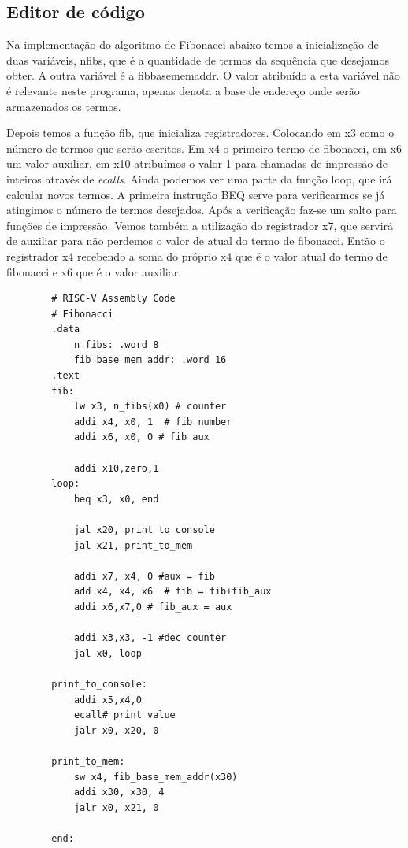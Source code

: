 \subsection{Editor de código}


	Na implementação do algoritmo de Fibonacci abaixo temos a inicialização de duas variáveis, n\textunderscore fibs, que é a quantidade de termos da sequência que desejamos obter. A outra variável é a fib\textunderscore base\textunderscore mem\textunderscore addr. O valor atribuído a esta variável não é relevante neste programa, apenas denota a base de endereço onde serão armazenados os termos.

	Depois temos a função fib, que inicializa registradores. Colocando em x3 como o número de termos que serão escritos. Em x4 o primeiro termo de fibonacci, em x6 um valor auxiliar, em x10 atribuímos o valor 1 para chamadas de impressão de inteiros através de \textit{ecalls}. Ainda podemos ver uma parte da função loop, que irá calcular novos termos. A primeira instrução BEQ serve para verificarmos se já atingimos o número de termos desejados. Após a verificação faz-se um salto para funções de impressão. Vemos também a utilização do registrador x7, que servirá de auxiliar para não perdemos o valor de atual do termo de fibonacci. Então o registrador x4 recebendo a soma do próprio x4 que é o valor atual do termo de fibonacci e x6 que é o valor auxiliar.

	\begin{verbatim}
        # RISC-V Assembly Code
        # Fibonacci
        .data
            n_fibs: .word 8
            fib_base_mem_addr: .word 16
        .text
        fib:
            lw x3, n_fibs(x0) # counter
            addi x4, x0, 1  # fib number
            addi x6, x0, 0 # fib aux

            addi x10,zero,1
        loop:
            beq x3, x0, end

            jal x20, print_to_console
            jal x21, print_to_mem

            addi x7, x4, 0 #aux = fib
            add x4, x4, x6  # fib = fib+fib_aux
            addi x6,x7,0 # fib_aux = aux
		    
            addi x3,x3, -1 #dec counter
            jal x0, loop

        print_to_console:
            addi x5,x4,0  
            ecall# print value
            jalr x0, x20, 0

        print_to_mem:
            sw x4, fib_base_mem_addr(x30)
            addi x30, x30, 4
            jalr x0, x21, 0

        end: 


	\end{verbatim}


